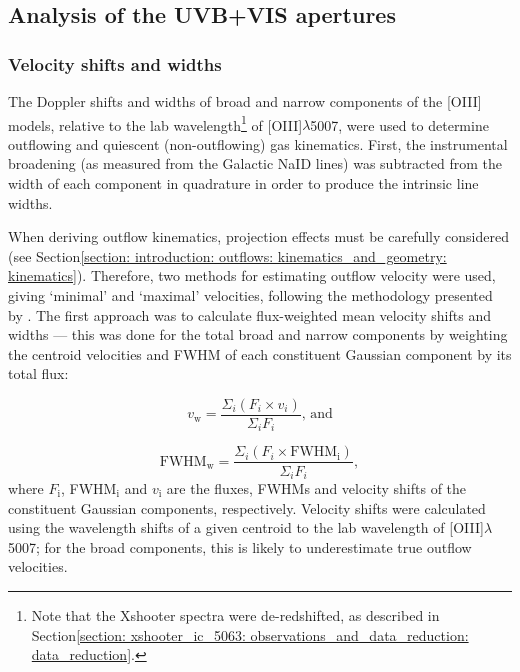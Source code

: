 \subsection{Analysis of the UVB+VIS apertures}
\label{section: xshooter_ic5063: properties_of_outflowing_gas: uvb_vis_analysis_and_results}

\subsubsection{Velocity shifts and widths}
\label{section: xshooter_ic5063: properties_of_outflowing_gas: uvb_vis_analysis_and_results: kinematics}

The Doppler shifts and widths of broad and narrow components of the [OIII] models, relative to the lab wavelength\footnote{Note that the Xshooter spectra were de-redshifted, as described in Section\;\ref{section: xshooter_ic_5063: observations_and_data_reduction: data_reduction}.} of [OIII]$\lambda$5007, were used to determine outflowing and quiescent (non-outflowing) gas kinematics. First, the instrumental broadening (as measured from the Galactic NaID lines) was subtracted from the width of each component in quadrature in order to produce the intrinsic line widths.

When deriving outflow kinematics, projection effects must be carefully considered (see Section\;\ref{section: introduction: outflows: kinematics_and_geometry: kinematics}). Therefore, two methods for estimating outflow velocity were used, giving `minimal' and `maximal' velocities, following the methodology presented by \citet{Rose2018}. The first approach was to calculate flux-weighted mean velocity shifts and widths --- this was done for the total broad and narrow components by weighting the centroid velocities and FWHM of each constituent Gaussian component by its total flux:

\begin{equation}
v_\mathrm{w} = \frac{\Sigma_i(F_i \times v_i)}{\Sigma_i{F_i}}\text{, and}
\label{eq: xshooter_ic5063: flux_velocity}
\end{equation}

\begin{equation}
\mathrm{FWHM_w} = \frac{\Sigma_i(F_i{\times}\mathrm{FWHM_i})}{\Sigma_i{F_i}},
\label{eq: xshooter_ic5063: flux_width}
\end{equation}
\noindent
where $F_\mathrm{i}$, FWHM$_\mathrm{i}$ and $v_\mathrm{i}$ are the fluxes, FWHMs and velocity shifts of the constituent Gaussian components, respectively. Velocity shifts were calculated using the wavelength shifts of a given centroid to the lab wavelength of [OIII]$\lambda$5007; for the broad components, this is likely to underestimate true outflow velocities.

